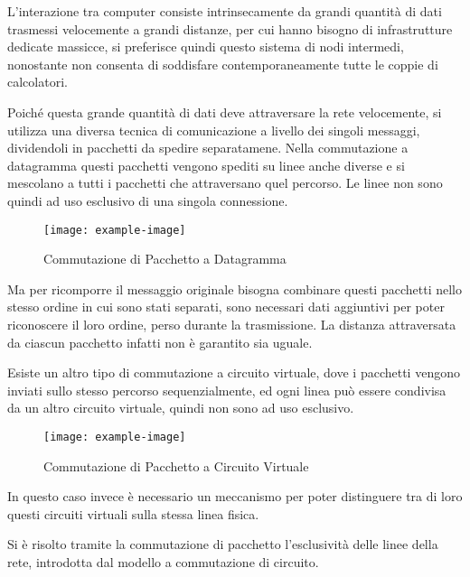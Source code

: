 \documentclass{article}
\numberwithin{equation}{subsection}
\begin{document}
L'interazione tra computer consiste intrinsecamente da grandi quantità di dati trasmessi velocemente a grandi distanze, per cui 
hanno bisogno di infrastrutture dedicate massicce, si preferisce quindi questo sistema di nodi intermedi, nonostante non consenta di soddisfare contemporaneamente 
tutte le coppie di calcolatori. 

Poiché questa grande quantità di dati deve attraversare la rete velocemente, si utilizza una diversa tecnica di comunicazione a livello dei singoli messaggi, dividendoli 
in pacchetti da spedire separatamene. Nella commutazione a datagramma questi pacchetti vengono spediti su linee anche diverse e si mescolano a tutti i pacchetti che 
attraversano quel percorso. Le linee non sono quindi ad uso esclusivo di una singola connessione. 
\begin{figure}[H]%
    \centering%
    \texttt{[image: example-image]}%
    \caption{Commutazione di Pacchetto a Datagramma}%
\end{figure}
Ma per ricomporre il messaggio originale bisogna combinare questi pacchetti nello stesso ordine in cui sono stati separati, sono necessari dati aggiuntivi per 
poter riconoscere il loro ordine, perso durante la trasmissione. La distanza attraversata da ciascun pacchetto infatti non è garantito sia uguale. 

Esiste un altro tipo di commutazione a circuito virtuale, dove i pacchetti vengono inviati sullo stesso percorso sequenzialmente, ed ogni linea può essere 
condivisa da un altro circuito virtuale, quindi non sono ad uso esclusivo. 
\begin{figure}[H]%
    \centering%
    \texttt{[image: example-image]}%
    \caption{Commutazione di Pacchetto a Circuito Virtuale}%
\end{figure}
In questo caso invece è necessario un meccanismo per poter distinguere tra di loro 
questi circuiti virtuali sulla stessa linea fisica. 

Si è risolto tramite la commutazione di pacchetto l'esclusività delle linee della rete, introdotta dal modello a commutazione di circuito. 
\end{document}
